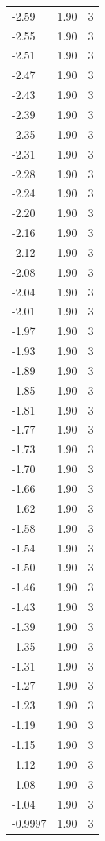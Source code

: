 \begin{longtable}{lrr}
  -2.59 & 1.90 & 3 \\
  -2.55 & 1.90 & 3 \\
  -2.51 & 1.90 & 3 \\
  -2.47 & 1.90 & 3 \\
  -2.43 & 1.90 & 3 \\
  -2.39 & 1.90 & 3 \\
  -2.35 & 1.90 & 3 \\
  -2.31 & 1.90 & 3 \\
  -2.28 & 1.90 & 3 \\
  -2.24 & 1.90 & 3 \\
  -2.20 & 1.90 & 3 \\
  -2.16 & 1.90 & 3 \\
  -2.12 & 1.90 & 3 \\
  -2.08 & 1.90 & 3 \\
  -2.04 & 1.90 & 3 \\
  -2.01 & 1.90 & 3 \\
  -1.97 & 1.90 & 3 \\
  -1.93 & 1.90 & 3 \\
  -1.89 & 1.90 & 3 \\
  -1.85 & 1.90 & 3 \\
  -1.81 & 1.90 & 3 \\
  -1.77 & 1.90 & 3 \\
  -1.73 & 1.90 & 3 \\
  -1.70 & 1.90 & 3 \\
  -1.66 & 1.90 & 3 \\
  -1.62 & 1.90 & 3 \\
  -1.58 & 1.90 & 3 \\
  -1.54 & 1.90 & 3 \\
  -1.50 & 1.90 & 3 \\
  -1.46 & 1.90 & 3 \\
  -1.43 & 1.90 & 3 \\
  -1.39 & 1.90 & 3 \\
  -1.35 & 1.90 & 3 \\
  -1.31 & 1.90 & 3 \\
  -1.27 & 1.90 & 3 \\
  -1.23 & 1.90 & 3 \\
  -1.19 & 1.90 & 3 \\
  -1.15 & 1.90 & 3 \\
  -1.12 & 1.90 & 3 \\
  -1.08 & 1.90 & 3 \\
  -1.04 & 1.90 & 3 \\
  -0.9997 & 1.90 & 3 \\

\end{longtable}
